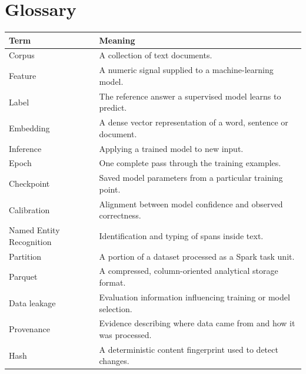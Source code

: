 \documentclass[12pt,a4paper]{report}
\begin{document}
\chapter{Glossary}

\begin{longtable}{p{}p{}}
\toprule
Term & Meaning \\
\midrule
\endhead
Corpus & A collection of text documents. \\
Feature & A numeric signal supplied to a machine-learning model. \\
Label & The reference answer a supervised model learns to predict. \\
Embedding & A dense vector representation of a word, sentence or document. \\
Inference & Applying a trained model to new input. \\
Epoch & One complete pass through the training examples. \\
Checkpoint & Saved model parameters from a particular training point. \\
Calibration & Alignment between model confidence and observed correctness. \\
Named Entity Recognition & Identification and typing of spans inside text. \\
Partition & A portion of a dataset processed as a Spark task unit. \\
Parquet & A compressed, column-oriented analytical storage format. \\
Data leakage & Evaluation information influencing training or model selection. \\
Provenance & Evidence describing where data came from and how it was processed. \\
Hash & A deterministic content fingerprint used to detect changes. \\
\bottomrule
\end{longtable}
\end{document}

